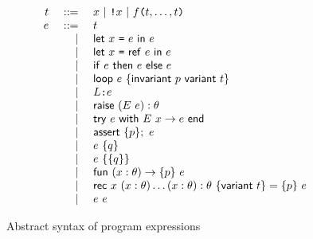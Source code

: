 \documentclass[a4paper,12pt]{report}
\begin{document}
\begin{figure}[htbp]
  \begin{displaymath}
    \begin{array}{rrl}
      t & ~::=~ & x ~|~ \texttt{!}x ~|~ f\texttt{(}t,\dots,t\texttt{)} \\
      e & ~::=~ & t \\
        &  |~ & \mathsf{let}~x~\texttt{=}~e~\mathsf{in}~e \\
        &  |~ & \mathsf{let}~x~\texttt{=}~\mathsf{ref}~e~\mathsf{in}~e \\
        &  |~ & \mathsf{if}~e~\mathsf{then}~e~\mathsf{else}~e \\
        &  |~ & \mathsf{loop}~e~\{\mathsf{invariant}~p~\mathsf{variant}~t\} \\
        &  |~ & L\texttt{:}e \\
        &  |~ & \mathsf{raise}~({E}~{e}):\theta \\
        &  |~ & \mathsf{try}~e~\mathsf{with}~E~x\rightarrow e~\mathsf{end} \\
        &  |~ & \mathsf{assert}~\{p\};~e \\
        &  |~ & e~\{q\} \\
        &  |~ & e~\{\{q\}\} \\
        &  |~ & \mathsf{fun}~(x:\theta)\rightarrow\{p\}~e \\
        &  |~ & \mathsf{rec}~x~(x:\theta)\dots(x:\theta):\theta~\{\mathsf{variant}~t\}=\{p\}~e \\
        &  |~ & e~e
    \end{array}
  \end{displaymath}
  \caption{Abstract syntax of program expressions}
  \label{fig:prog:expr}
\end{figure}
\end{document}
